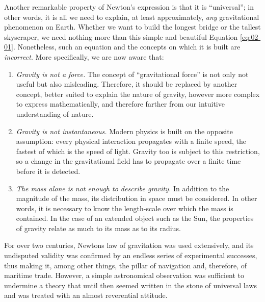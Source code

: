 Another remarkable property of Newton's expression is that it is ``universal''; in other
words, it is all we need to explain, at least approximately, \emph{any} gravitational
phenomenon on Earth. Whether we want to build the longest bridge or the tallest
skyscraper, we need nothing more than this simple and beautiful Equation \eqref{eq:02-01}.
Nonetheless, such an equation and the concepts on which it is built are
\emph{incorrect}. More specifically, we are now aware that:

\begin{enumerate}
\def\labelenumi{\arabic{enumi}.}
\item

  \emph{Gravity is not a force.} The concept of ``gravitational force'' is not only not
  useful but also misleading. Therefore, it should be replaced by another concept,
  better suited to explain the nature of gravity, however more complex to express
  mathematically, and therefore farther from our intuitive understanding of nature.
\item

  \emph{Gravity is not instantaneous}\emph{.} Modern
  physics is built on the opposite assumption: every physical interaction propagates
  with a finite speed, the fastest of which is the speed of light. Gravity too is
  subject to this restriction, so a change in the gravitational field has to propagate
  over a finite time before it is detected.
\item

  \emph{The mass alone is not enough to describe gravity.} In addition to the magnitude
  of the mass, its distribution in space must be considered. In other words, it is
  necessary to know the length-scale over which the mass is contained. In the case of an
  extended object such as the Sun, the properties of gravity relate as much to its mass
  as to its radius.
\end{enumerate}

For over two centuries, Newton\textquotesingle s law of gravitation was used
extensively, and its undisputed validity was confirmed by an endless series of
experimental successes, thus making it, among other things, the pillar of navigation
and, therefore, of maritime trade. However, a simple astronomical observation was
sufficient to undermine a theory that until then seemed written in the stone of
universal laws and was treated with an almost reverential attitude.

